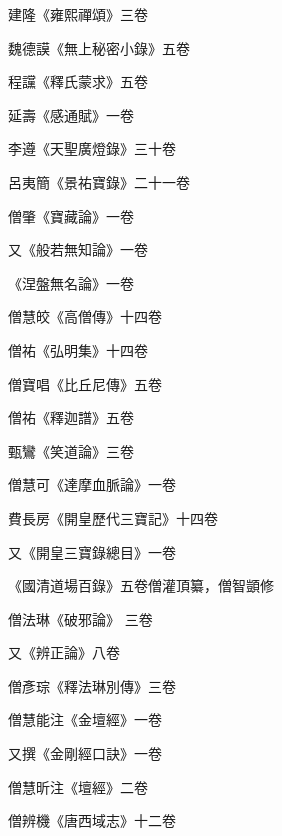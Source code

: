 \begin{pinyinscope}
 建隆《雍熙禪頌》三卷



 魏德謨《無上秘密小錄》五卷



 程讜《釋氏蒙求》五卷



 延壽《感通賦》一卷



 李遵《天聖廣燈錄》三十卷



 呂夷簡《景祐寶錄》二十一卷



 僧肇《寶藏論》一卷



 又《般若無知論》一卷



 《涅盤無名論》一卷



 僧慧皎《高僧傳》十四卷



 僧祐《弘明集》十四卷



 僧寶唱《比丘尼傳》五卷



 僧祐《釋迦譜》五卷



 甄鸞《笑道論》三卷



 僧慧可《達摩血脈論》一卷



 費長房《開皇歷代三寶記》十四卷



 又《開皇三寶錄總目》一卷



 《國清道場百錄》五卷僧灌頂纂，僧智顗修



 僧法琳《破邪論》
 三卷



 又《辨正論》八卷



 僧彥琮《釋法琳別傳》三卷



 僧慧能注《金壇經》一卷



 又撰《金剛經口訣》一卷



 僧慧昕注《壇經》二卷



 僧辨機《唐西域志》十二卷




\end{pinyinscope}
